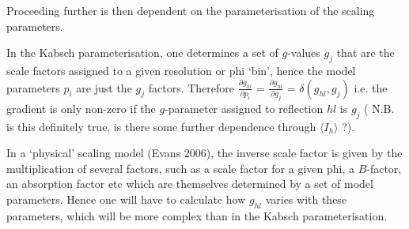 \documentclass[11pt, oneside]{article}   	%
\begin{document}
Proceeding further is then dependent on the parameterisation of the scaling parameters.

In the Kabsch parameterisation, one determines a set of $g$-values $g_j$ that are the scale factors assigned to a given resolution or phi `bin', hence the model parameters $p_i$ are just the $g_{j}$ factors. Therefore $\frac{\partial g_{hl}}{\partial p_i}$ = $\frac{\partial g_{hl}}{\partial g_j}$  = $\delta(g_{hl},g_{j})$ i.e. the gradient is only non-zero if the $g$-parameter assigned to reflection $hl$ is $g_j$ ({\color{red} N.B. is this definitely true, is there some further dependence through $\langle I_h \rangle$ ?}).

In a `physical' scaling model (Evans 2006), the inverse scale factor is given by the multiplication of several factors, such as a scale factor for a given phi, a $B$-factor, an absorption factor etc which are themselves determined by a set of model parameters. Hence one will have to calculate how $g_{hl}$ varies with these parameters, which will be more complex than in the Kabsch parameterisation.

\end{document}

